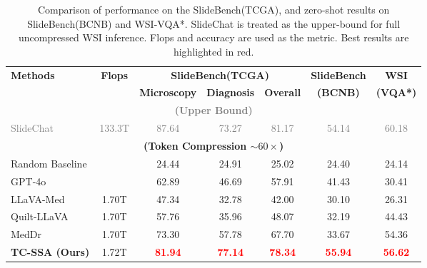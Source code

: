 \documentclass[runningheads]{llncs}
\begin{document}
\begin{table}[htbp]
\centering
\caption{Comparison of performance on the SlideBench(TCGA), and zero-shot results on SlideBench(BCNB) and WSI-VQA*. 
SlideChat\cite{Chen2025SlideChat} is treated as the upper-bound for full uncompressed WSI inference. 
Flops and accuracy are used as the metric.
Best results are highlighted in red.}
\label{tab:combined_results}
\begin{adjustbox}{width=.85\textwidth}{
\begin{tabular}{lcccccc}
\toprule
\multirow{2}{*}{\textbf{Methods}} & \multirow{2}{*}{\textbf{Flops}} & \multicolumn{3}{c}{\textbf{SlideBench(TCGA)}} & \textbf{SlideBench} & \textbf{WSI} \\
\cmidrule(lr){3-5} 
 & & \textbf{Microscopy} & \textbf{Diagnosis} & \textbf{Overall} & \textbf{(BCNB)} & \textbf{(VQA*)} \\
\midrule
\multicolumn{7}{c}{\textcolor{gray}{\textbf{(Upper Bound)}}} \\
\textcolor{gray}{SlideChat \cite{Chen2025SlideChat}} & \textcolor{gray}{133.3T} & \textcolor{gray}{87.64} & \textcolor{gray}{73.27} & \textcolor{gray}{81.17} & \textcolor{gray}{54.14} & \textcolor{gray}{60.18} \\
\midrule
\multicolumn{7}{c}{\textbf{(Token Compression $\sim60\times$)}} \\
Random Baseline & & 24.44 & 24.91 & 25.02 & 24.40 & 24.14 \\
GPT-4o \cite{OpenAI2024GPTo} & & 62.89 & 46.69 & 57.91 & 41.43 & 30.41 \\
LLaVA-Med \cite{Li2023LLaVAMed} & 1.70T & 47.34 & 32.78 & 42.00 & 30.10 & 26.31 \\
Quilt-LLaVA \cite{Seyfioglu2024QuiltLLaVA} & 1.70T & 57.76 & 35.96 & 48.07 & 32.19 & 44.43 \\
MedDr \cite{He2024MedDr} & 1.70T & 73.30 & 57.78 & 67.70 & 33.67 & 54.36 \\
\midrule
\textbf{TC-SSA (Ours)} & 1.72T & \textcolor{red}{\textbf{81.94}} & \textcolor{red}{\textbf{77.14}} & \textcolor{red}{\textbf{78.34}} & \textcolor{red}{\textbf{55.94}} & \textcolor{red}{\textbf{56.62}} \\
\bottomrule
\end{tabular}
}\end{adjustbox}
\end{table}
\end{document}
